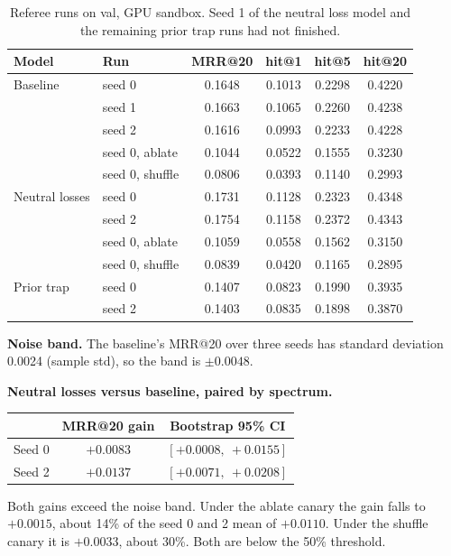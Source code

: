\documentclass[11pt]{article}
\begin{document}
\begin{table}[h]
\centering
\begin{tabular}{llcccc}
\toprule
Model & Run & MRR@20 & hit@1 & hit@5 & hit@20 \\
\midrule
Baseline & seed 0 & 0.1648 & 0.1013 & 0.2298 & 0.4220 \\
         & seed 1 & 0.1663 & 0.1065 & 0.2260 & 0.4238 \\
         & seed 2 & 0.1616 & 0.0993 & 0.2233 & 0.4228 \\
         & seed 0, ablate & 0.1044 & 0.0522 & 0.1555 & 0.3230 \\
         & seed 0, shuffle & 0.0806 & 0.0393 & 0.1140 & 0.2993 \\
\midrule
Neutral losses & seed 0 & 0.1731 & 0.1128 & 0.2323 & 0.4348 \\
               & seed 2 & 0.1754 & 0.1158 & 0.2372 & 0.4343 \\
               & seed 0, ablate & 0.1059 & 0.0558 & 0.1562 & 0.3150 \\
               & seed 0, shuffle & 0.0839 & 0.0420 & 0.1165 & 0.2895 \\
\midrule
Prior trap & seed 0 & 0.1407 & 0.0823 & 0.1990 & 0.3935 \\
           & seed 2 & 0.1403 & 0.0835 & 0.1898 & 0.3870 \\
\bottomrule
\end{tabular}
\caption{Referee runs on val, GPU sandbox. Seed 1 of the neutral loss model and the remaining prior trap runs had not
finished.}
\label{tab:referee}
\end{table}

\textbf{Noise band.} The baseline's MRR@20 over three seeds has standard deviation 0.0024 (sample std), so the band is
$\pm 0.0048$.

\textbf{Neutral losses versus baseline, paired by spectrum.}
\begin{center}
\begin{tabular}{lcc}
\toprule
 & MRR@20 gain & Bootstrap 95\% CI \\
\midrule
Seed 0 & $+0.0083$ & $[+0.0008,\ +0.0155]$ \\
Seed 2 & $+0.0137$ & $[+0.0071,\ +0.0208]$ \\
\bottomrule
\end{tabular}
\end{center}
Both gains exceed the noise band. Under the ablate canary the gain falls to $+0.0015$, about 14\% of the seed 0
and 2 mean of $+0.0110$. Under the shuffle canary it is $+0.0033$, about 30\%. Both are below the 50\% threshold.
\end{document}
